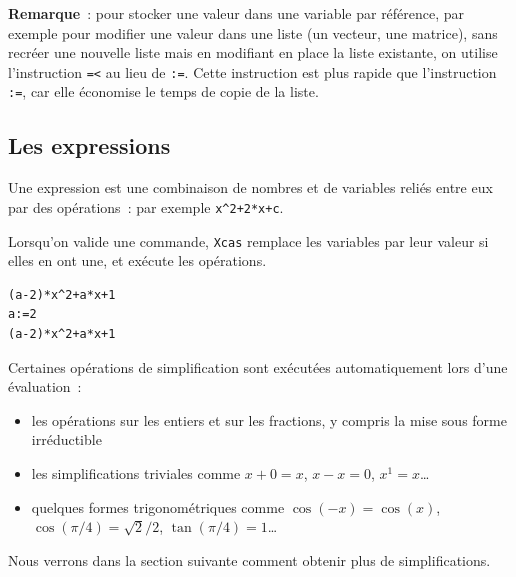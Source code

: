 \documentclass{article}
\begin{document}
{\bf Remarque}~: pour stocker une valeur dans une variable par r\'ef\'erence,
par exemple pour modifier une valeur dans une liste (un vecteur, une
matrice), sans recr\'eer une nouvelle liste mais en modifiant
en place la liste existante, on utilise l'instruction \verb|=<|
au lieu de \verb|:=|.
Cette instruction est plus rapide que l'instruction \verb|:=|, car
elle \'economise le temps de copie de la liste.
%
\subsection{Les expressions}
%
Une expression est une combinaison de nombres et de variables
reli\'es entre eux par des op\'erations~: par exemple 
\verb|x^2+2*x+c|. 

Lorsqu'on valide une commande, {\tt Xcas}
remplace les variables par leur valeur si elles en ont une,
et ex\'ecute les op\'erations. 
\begin{verbatim}
(a-2)*x^2+a*x+1
a:=2
(a-2)*x^2+a*x+1
\end{verbatim}
Certaines op\'erations de simplification sont ex\'ecut\'ees
automatiquement lors d'une \'evaluation~:
\begin{itemize}
\item les op\'erations sur les entiers et sur les 
fractions, y compris la mise
sous forme irr\'eductible
\item les simplifications triviales comme $x+0=x$,
$x-x=0$, $x^1=x$\ldots
\item quelques formes trigonom\'etriques comme 
$\cos(-x)=\cos(x)$, $\cos(\pi/4)=\sqrt{2}/2$, $\tan(\pi/4)=1$\ldots
\end{itemize}
Nous verrons dans la section suivante comment obtenir plus de simplifications.
%
\end{document}
